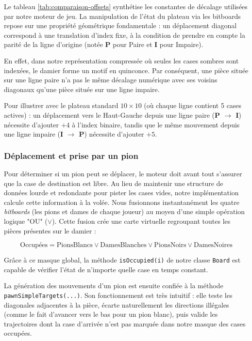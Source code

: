 \documentclass[a4paper]{article}
\begin{document}
Le tableau \ref{tab:comparaison-offsets} synthétise les constantes de décalage utilisées par notre moteur de jeu. La manipulation de l'état du plateau via les bitboards 
repose sur une propriété géométrique fondamentale : un déplacement diagonal correspond à une translation d'index fixe, à la condition de prendre en compte la parité de la 
ligne d'origine (notée \textbf{P} pour Paire et \textbf{I} pour Impaire). 

En effet, dans notre représentation compressée où seules les cases sombres sont indexées, le damier forme un motif en quinconce. Par conséquent, une pièce située sur 
une ligne paire n'a pas le même décalage numérique avec ses voisins diagonaux qu'une pièce située sur une ligne impaire.

Pour illustrer avec le plateau standard $10 \times 10$ (où chaque ligne contient 5 cases actives) : un déplacement vers le Haut-Gauche depuis une ligne paire 
(\textbf{P $\to$ I}) nécessite d'ajouter $+4$ à l'index binaire, tandis que le même mouvement depuis une ligne impaire (\textbf{I $\to$ P}) nécessite d'ajouter $+5$.


\subsubsection{Déplacement et prise par un pion}

Pour déterminer si un pion peut se déplacer, le moteur doit avant tout s'assurer que la case de destination est libre. Au lieu de maintenir 
une structure de données lourde et redondante pour pister les cases vides, notre implémentation calcule cette information à la volée. Nous 
fusionnons instantanément les quatre \textit{bitboards} (les pions et dames de chaque joueur) au moyen d'une simple opération logique "OU"
 ($\lor$). Cette fusion crée une carte virtuelle regroupant toutes les pièces présentes sur le damier :

\[
\text{Occupées} = \text{PionsBlancs} \lor \text{DamesBlanches} \lor \text{PionsNoirs} \lor \text{DamesNoires}
\]

Grâce à ce masque global, la méthode \texttt{isOccupied(i)} de notre classe \texttt{Board} est capable de vérifier l'état de n'importe 
quelle case en temps constant. 

La génération des mouvements d'un pion est ensuite confiée à la méthode \texttt{pawnSimpleTargets(...)}. Son fonctionnement est très 
intuitif : elle teste les diagonales adjacentes à la pièce, écarte naturellement les directions illégales (comme le fait d'avancer vers
 le bas pour un pion blanc), puis valide les trajectoires dont la case d'arrivée n'est pas marquée dans notre masque des cases occupées.
\end{document}
